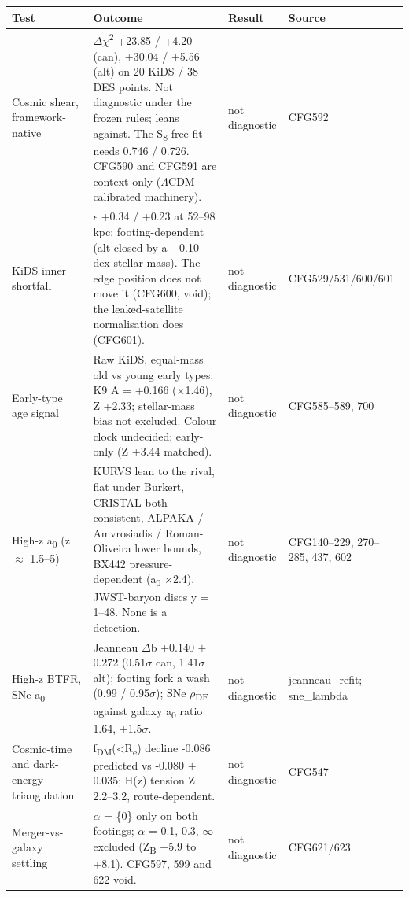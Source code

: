 \documentclass[10pt]{article}
\begin{document}
{\footnotesize\begin{longtable}{>{\raggedright\arraybackslash}p{4.4cm}>{\raggedright\arraybackslash}p{11.6cm}>{\raggedright\arraybackslash}p{2.0cm}>{\raggedright\arraybackslash}p{3.4cm}}
\toprule\textbf{Test} & \textbf{Outcome} & \textbf{Result} & \textbf{Source}\\\midrule\endhead
Cosmic shear, framework-native & \ensuremath{\Delta}\ensuremath{\chi}\textsuperscript{2} +23.85 / +4.20 (can), +30.04 / +5.56 (alt) on 20 KiDS / 38 DES points. Not diagnostic under the frozen rules; leans against. The S\textsubscript{8}-free fit needs 0.746 / 0.726. CFG590 and CFG591 are context only (\ensuremath{\Lambda}CDM-calibrated machinery). & not diagnostic & CFG592 \\
KiDS inner shortfall & \ensuremath{\epsilon} +0.34 / +0.23 at 52--98 kpc; footing-dependent (alt closed by a +0.10 dex stellar mass). The edge position does not move it (CFG600, void); the leaked-satellite normalisation does (CFG601). & not diagnostic & CFG529/531/600/601 \\
Early-type age signal & Raw KiDS, equal-mass old vs young early types: K9 A = +0.166 (\ensuremath{\times}1.46), Z +2.33; stellar-mass bias not excluded. Colour clock undecided; early-only (Z +3.44 matched). & not diagnostic & CFG585--589, 700 \\
High-z a\textsubscript{0} (z \ensuremath{\approx} 1.5--5) & KURVS lean to the rival, flat under Burkert, CRISTAL both-consistent, ALPAKA / Amvrosiadis / Roman-Oliveira lower bounds, BX442 pressure-dependent (a\textsubscript{0} \ensuremath{\times}2.4), JWST-baryon discs y = 1--48. None is a detection. & not diagnostic & CFG140--229, 270--285, 437, 602 \\
High-z BTFR, SNe a\textsubscript{0} & Jeanneau \ensuremath{\Delta}b +0.140 \ensuremath{\pm} 0.272 (0.51\ensuremath{\sigma} can, 1.41\ensuremath{\sigma} alt); footing fork a wash (0.99 / 0.95\ensuremath{\sigma}); SNe \ensuremath{\rho}\textsubscript{DE} against galaxy a\textsubscript{0} ratio 1.64, +1.5\ensuremath{\sigma}. & not diagnostic & jeanneau\_refit; sne\_lambda \\
Cosmic-time and dark-energy triangulation & f\textsubscript{DM}(<R\textsubscript{e}) decline -0.086 predicted vs -0.080 \ensuremath{\pm} 0.035; H(z) tension Z 2.2--3.2, route-dependent. & not diagnostic & CFG547 \\
Merger-vs-galaxy settling & \ensuremath{\alpha} = \{0\} only on both footings; \ensuremath{\alpha} = 0.1, 0.3, \ensuremath{\infty} excluded (Z\textsubscript{B} +5.9 to +8.1). CFG597, 599 and 622 void. & not diagnostic & CFG621/623 \\

\end{longtable}}
\end{document}
